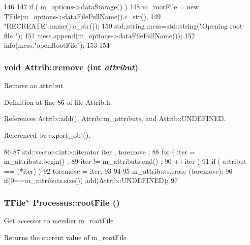 \begin{DoxyCode}
146                                {
147   if ( m_options->dataStorage() ){
148     m_rootFile = new TFile(m_options->dataFileFullName().c_str(),
149                            "RECREATE",name().c_str());
150         std::string mess=std::string("Opening root file ");
151         mess.append(m_options->dataFileFullName());
152         info(mess,"openRootFile");
153   }
154 }
\end{DoxyCode}
\hypertarget{classAttrib_a7d4ef7e32d93cb287792b87b857e79f3}{
\subsubsection[{remove}]{\setlength{\rightskip}{0pt plus 5cm}void Attrib::remove (int {\em attribut})}}
\label{classAttrib_a7d4ef7e32d93cb287792b87b857e79f3}
Remove an attribut 

Definition at line 86 of file Attrib.h.

References Attrib::add(), Attrib::m\_\-attributs, and Attrib::UNDEFINED.

Referenced by export\_\-obj().


\begin{DoxyCode}
86                                {
87     std::vector<int>::iterator iter , toremove ;
88     for ( iter  = m_attributs.begin() ;
89           iter != m_attributs.end()   ;
90           ++iter ) {
91       if ( attribut == (*iter) ) {
92         toremove = iter;
93       }
94     }
95     m_attributs.erase (toremove);
96     if(0==m_attributs.size()) add(Attrib::UNDEFINED);
97   }
\end{DoxyCode}
\hypertarget{classProcessus_a247e8c362ec08422cf53d08dd23b093c}{
\subsubsection[{rootFile}]{\setlength{\rightskip}{0pt plus 5cm}TFile$\ast$ Processus::rootFile ()}}
\label{classProcessus_a247e8c362ec08422cf53d08dd23b093c}
Get accessor to member m\_\-rootFile \begin{DoxyReturn}{Returns}
the current value of m\_\-rootFile 
\end{DoxyReturn}


